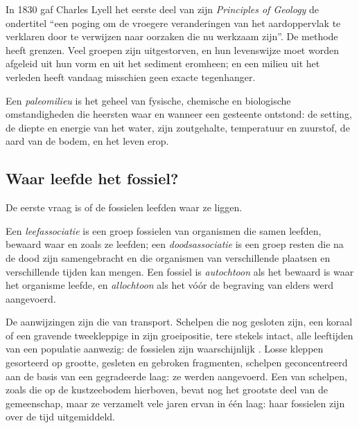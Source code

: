 In 1830 gaf Charles Lyell het eerste deel van zijn \emph{Principles of Geology} de ondertitel ``een
poging om de vroegere veranderingen van het aardoppervlak te verklaren door te verwijzen naar oorzaken die nu
werkzaam zijn''. De methode heeft grenzen. Veel groepen zijn uitgestorven, en hun levenswijze moet worden
afgeleid uit hun vorm en uit het sediment eromheen; en een milieu uit het verleden heeft vandaag misschien
geen exacte tegenhanger.

\begin{definition}[Paleomilieu]\label{def:b2:palaeoenvironments:palaeoenvironment}
Een \emph{paleomilieu} is het geheel van fysische, chemische en
biologische omstandigheden die heersten waar en wanneer een gesteente ontstond: de setting, de diepte en
energie van het water, zijn zoutgehalte, temperatuur en zuurstof, de aard van de bodem, en het leven
erop.
\end{definition}

\subsection*{Waar leefde het fossiel?}

De eerste vraag is of de fossielen leefden waar ze liggen.

\begin{definition}\label{def:b2:palaeoenvironments:assemblages}
Een \emph{leefassociatie} is een groep fossielen van organismen die samen
leefden, bewaard waar en zoals ze leefden; een \emph{doodsassociatie} is
een groep resten die na de dood zijn samengebracht en die organismen van verschillende plaatsen
en verschillende tijden kan mengen. Een fossiel is \emph{autochtoon} als het
bewaard is waar het organisme leefde, en \emph{allochtoon} als het
vóór de begraving van elders werd aangevoerd.
\end{definition}

De aanwijzingen zijn die van transport. Schelpen die nog gesloten zijn, een koraal of een gravende tweekleppige in zijn
groeipositie, tere stekels intact, alle leeftijden van een populatie aanwezig: de fossielen zijn
waarschijnlijk . Losse kleppen gesorteerd op grootte, gesleten en gebroken fragmenten, schelpen
geconcentreerd aan de basis van een gegradeerde laag: ze werden aangevoerd. Een  van schelpen, zoals
die op de kustzeebodem hierboven, bevat nog het grootste deel van de gemeenschap, maar ze verzamelt vele jaren
ervan in één laag: haar fossielen zijn over de tijd uitgemiddeld.


